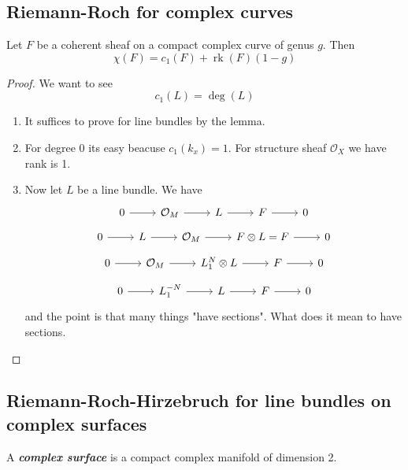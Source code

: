 \subsection{Riemann-Roch for complex curves}

\begin{thm}\leavevmode
	Let $F$ be a coherent sheaf on a compact complex curve of genus $g$. Then
	\[\chi(F)=c_1(F)+\operatorname{rk}(F)(1-g)\]
\end{thm}

\begin{proof}\leavevmode 
 We want to see
			\[c_1(L)=\operatorname{deg}(L)\]

	\begin{enumerate}[label=\textbf{Step \arabic*}]
		\item It suffices to prove for line bundles by the lemma.

		\item For degree 0 its easy beacuse $c_1(k_{x})=1$. For structure sheaf $\mathcal{O}_X$ we have rank is 1.

		\item Now let $ L$ be a line bundle. We have
			\[\begin{tikzcd}
				0\arrow[r]&\mathcal{O}_M\arrow[r]&L\arrow[r]&F\arrow[r]&0
			\end{tikzcd}\]
			\[\begin{tikzcd}
				0\arrow[r]&L\arrow[r]&\mathcal{O}_M\arrow[r]&F\otimes L=F\arrow[r]&0
			\end{tikzcd}\]
			\[\begin{tikzcd}
				0\arrow[r]&\mathcal{O}_{M}\arrow[r]&L_1^N\otimes L\arrow[r]&F\arrow[r]&0
			\end{tikzcd}\]
			\[\begin{tikzcd}
				0\arrow[r]&L_1^{-N}\arrow[r]&L\arrow[r]&F\arrow[r]&0
			\end{tikzcd}\]
		and the point is that many things "have sections". What does it mean to have sections.
	\end{enumerate}
\end{proof}

\subsection{Riemann-Roch-Hirzebruch for line bundles on complex surfaces}

\begin{defn}
	A \textit{\textbf{complex surface}} is a compact complex manifold of dimension 2.
\end{defn}

